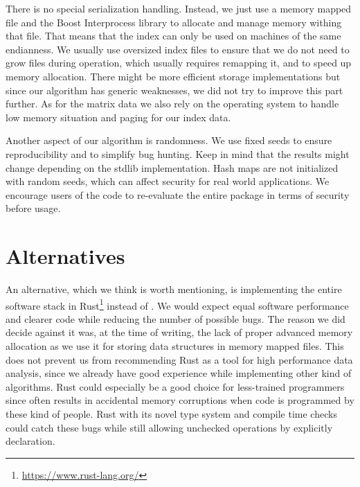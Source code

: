 There is no special serialization handling. Instead, we just use a memory mapped file and the Boost Interprocess library to allocate and manage memory withing that file. That means that the index can only be used on machines of the same endianness. We usually use oversized index files to ensure that we do not need to grow files during operation, which usually requires remapping it, and to speed up memory allocation. There might be more efficient storage implementations but since our algorithm has generic weaknesses, we did not try to improve this part further. As for the matrix data we also rely on the operating system to handle low memory situation and paging for our index data.

Another aspect of our algorithm is randomness. We use fixed seeds to ensure reproducibility and to simplify bug hunting. Keep in mind that the results might change depending on the stdlib implementation. Hash maps are not initialized with random seeds, which can affect security for real world applications. We encourage users of the code to re-evaluate the entire package in terms of security before usage.



\section{Alternatives}
\label{sec:implementation:alternatives}

An alternative, which we think is worth mentioning, is implementing the entire software stack in Rust\footnote{\url{https://www.rust-lang.org/}} instead of \Cpp{}. We would expect equal software performance and clearer code while reducing the number of possible bugs. The reason we did decide against it was, at the time of writing, the lack of proper advanced memory allocation as we use it for storing data structures in memory mapped files. This does not prevent us from recommending Rust as a tool for high performance data analysis, since we already have good experience while implementing other kind of algorithms. Rust could especially be a good choice for less-trained programmers since \Cpp{} often results in accidental memory corruptions when code is programmed by these kind of people. Rust with its novel type system and compile time checks could catch these bugs while still allowing unchecked operations by explicitly declaration.
